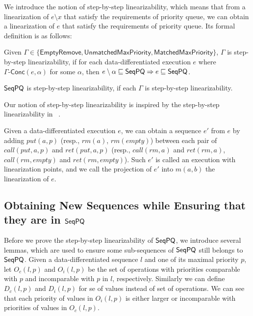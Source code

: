 We introduce the notion of step-by-step linearizability, which means that from a linearization of $e \setminus x$ that satisfy the requirements of priority queue, we can obtain a linearization of $e$ that satisfy the requirements of priority queue. Its formal definition is as follows:

\begin{definition}\label{def:step-by-step linearizability}
Given $\Gamma\in \{\mathsf{EmptyRemove}, \mathsf{UnmatchedMaxPriority}, \mathsf{MatchedMaxPriority}\}$, $\Gamma$ is step-by-step linearizability, if for each data-differentiated execution $e$ where $\Gamma\mathsf{\text{-}Conc}(e,\alpha)$ for some $\alpha$, then $e \setminus \alpha \sqsubseteq \mathsf{SeqPQ} \Rightarrow e \sqsubseteq \mathsf{SeqPQ}$.

$\mathsf{SeqPQ}$ is step-by-step linearizability, if each $\Gamma$ is step-by-step linearizability.
\end{definition}

Our notion of step-by-step linearizability is inspired by the step-by-step linearizability in ~\cite{DBLP:conf/icalp/BouajjaniEEH15}.


Given a data-differentiated execution $e$, we can obtain a sequence $e'$ from $e$ by adding $\textit{put}(a,p)$ (resp., $\textit{rm}(a)$, $\textit{rm}(\textit{empty})$) between each pair of $\textit{call}(\textit{put},a,p)$ and $\textit{ret}(\textit{put},a,p)$ (resp., $\textit{call}(\textit{rm},a)$ and $\textit{ret}(\textit{rm},a)$, $\textit{call}(\textit{rm},\textit{empty})$ and $\textit{ret}(\textit{rm},\textit{empty})$). Such $e'$ is called an execution with linearization points, and we call the projection of $e'$ into $m(a,b)$ the linearization of $e$.




\subsection{Obtaining New Sequences while Ensuring that they are in $\mathsf{SeqPQ}$}
\label{sec:obtaining new sequences while ensureing that they are in SeqPQ}


Before we prove the step-by-step linearizability of $\mathsf{SeqPQ}$, we introduce several lemmas, which are used to ensure some sub-sequences of $\mathsf{SeqPQ}$ still belongs to $\mathsf{SeqPQ}$. Given a data-differentiated sequence $l$ and one of its maximal priority $p$, let $O_c(l,p)$ and $O_i(l,p)$ be the set of operations with priorities comparable with $p$ and incomparable with $p$ in $l$, respectively. Similarly we can define $D_c(l,p)$ and $D_i(l,p)$ for se of values instead of set of operations. We can see that each priority of values in $O_i(l,p)$ is either larger or incomparable with priorities of values in  $O_c(l,p)$.

